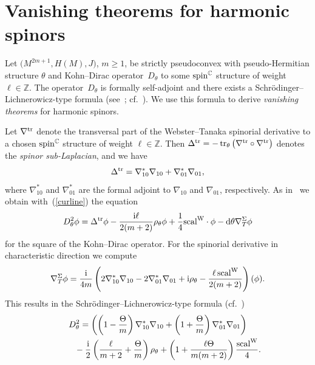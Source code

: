 \documentclass[10pt,a4paper]{amsart}
\numberwithin{equation}{section}
\newcommand{\ZZ}{\mathbb{Z}}
\newcommand{\CC}{\mathbb{C}}
\begin{document}
\section{Vanishing theorems for harmonic spinors} \label{Sec8}

Let $\big(M^{2m+1}, H(M), J\big)$, $m\geq 1$, be strictly pseudoconvex with pseudo-Hermitian structure $\theta$ and Kohn--Dirac operator~$D_\theta$ to some ${\rm spin}^\CC$ structure of weight $\ell\in\ZZ$.
The operator~$D_\theta$ is formally
self-adjoint and there exists a Schr\"odinger--Lichnerowicz-type formula (see~\cite{Pet}; cf.~\cite{LeiN1}).
We use this formula to derive {\em vanishing theorems} for harmonic spinors.

Let $\nabla^{\rm tr}$ denote the transversal part of the Webster--Tanaka spinorial derivative to a chosen
${\rm spin}^\CC$ structure of weight $\ell\in\ZZ$.
Then $\Delta^{\rm tr}=-\operatorname{tr}_{\theta} \big(\nabla^{\rm tr}\circ\nabla^{\rm tr}\big)$ denotes the {\em spinor sub-Laplacian}, and
we have
\[
\Delta^{\rm tr} = \nabla^*_{10}\nabla_{10} + \nabla^*_{01}\nabla_{01},
\]
where $\nabla^*_{10}$ and $\nabla^*_{01}$ are the formal adjoint to $\nabla_{10}$ and $\nabla_{01}$, respectively.
As in~\cite{LeiN1} we obtain with~(\ref{curline}) the equation
\begin{equation*}%
D_\theta^2\phi = \Delta^{\rm tr}\phi - \frac{{\rm i}\ell}{2(m+2)}\rho_\theta\phi + \frac{1}{4}{\rm scal}^{\rm W}\cdot\phi - {\rm d}\theta\nabla^{\Sigma}_T\phi
\end{equation*}
for the square of the Kohn--Dirac operator. For the spinorial derivative in characteristic direction we compute
\begin{gather*}%
\nabla^\Sigma_T\phi = \frac{{\rm i}}{4m}\left( 2\nabla^*_{10}\nabla_{10}-2\nabla^*_{01}\nabla_{01} + {\rm i}\rho_\theta - \frac{\ell \operatorname{scal}^{\rm W}}{2(m+2)}
\right)(\phi).
\end{gather*}
This results in the Schr\"odinger--Lichnerowicz-type formula (cf.~\cite{LeiN1, Pet})
\begin{gather}\nonumber
D_\theta^2 = \left( \left(1-\frac{\Theta}{m}\right) \nabla^*_{10}\nabla_{10} + \left(1+\frac{\Theta}{m}\right) \nabla^*_{01}\nabla_{01}\right)\\
\hphantom{D_\theta^2 =}{} - \frac{{\rm i}}{2}\left( \frac{\ell}{m+2}+\frac{\Theta}{m}\right)\rho_\theta + \left(1+\frac{\ell\Theta}{m(m+2)}\right)\frac{{\rm scal}^{\rm W}}{4}.\label{formtheo}
\end{gather}
\end{document}
